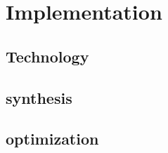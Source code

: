 %
\chapter{Implementation}
\label{Implementation}



\section{Technology}


	
\section{synthesis}


\section{optimization}